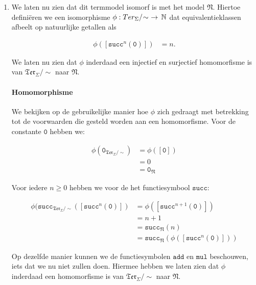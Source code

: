 \documentclass[a4paper,11pt]{article}
\begin{document}
\begin{enumerate}
\item %

We laten nu zien dat dit termmodel isomorf is met het model
$\mathfrak{N}$. Hiertoe defini\"eren we een isomorphisme $\phi :
Ter_{\Sigma}/\negmedspace\sim \, \, \rightarrow \, \mathbb{N}$ dat
equivalentieklassen afbeelt op natuurlijke getallen als

\begin{align*}
\phi([\texttt{succ}^{n}(\texttt{0})]) &= n.
\end{align*}

We laten nu zien dat $\phi$ inderdaad een injectief en surjectief homomorfisme
is van $\mathfrak{Ter}_{\Sigma}/\sim$ naar $\mathfrak{N}$.

\paragraph{Homomorphisme}

We bekijken op de gebruikelijke manier hoe $\phi$ zich gedraagt met betrekking
tot de voorwaarden die gesteld worden aan een homomorfisme. Voor de constante
$\texttt{0}$ hebben we:

\begin{align*}
\phi(\texttt{0}_{\mathfrak{Ter}_{\Sigma}/\sim}) &= \phi([\texttt{0}]) \\
                                                &= 0 \\
                                                &= \texttt{0}_{\mathfrak{N}}
\end{align*}

Voor iedere $n \ge 0$ hebben we voor de het functiesymbool $\texttt{succ}$:

\begin{align*}
\phi(\texttt{succ}_{\mathfrak{Ter}_{\Sigma}/\sim}([\texttt{succ}^{n}(\texttt{0})])
  &= \phi([\texttt{succ}^{n+1}(\texttt{0})]) \\
  &= n+1 \\
  &= \texttt{succ}_{\mathfrak{N}}(n) \\
  &= \texttt{succ}_{\mathfrak{N}}(\phi([\texttt{succ}^{n}(\texttt{0})]))
\end{align*}

Op dezelfde manier kunnen we de functiesymbolen $\texttt{add}$ en
$\texttt{mul}$ beschouwen, iets dat we nu niet zullen doen. Hiermee hebben we
laten zien dat $\phi$ inderdaad een homomorfisme is van
$\mathfrak{Ter}_{\Sigma}/\sim$ naar $\mathfrak{N}$.


\end{enumerate}
\end{document}

